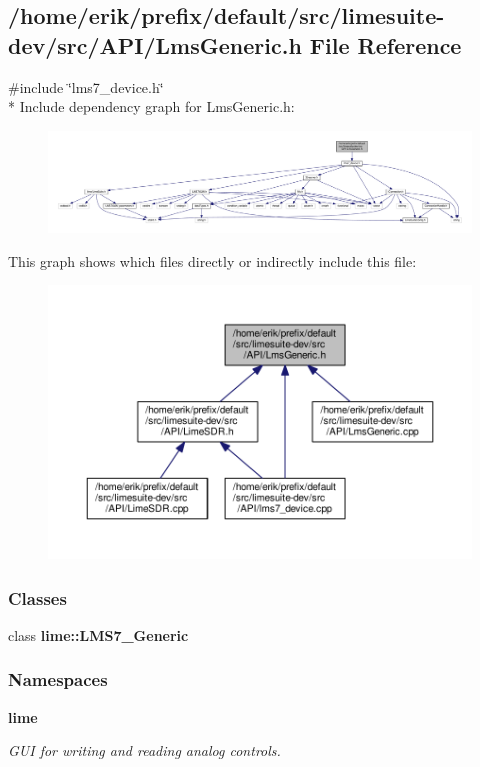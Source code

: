 \subsection{/home/erik/prefix/default/src/limesuite-\/dev/src/\+A\+P\+I/\+Lms\+Generic.h File Reference}
\label{LmsGeneric_8h}
{\ttfamily \#include \char`\"{}lms7\+\_\+device.\+h\char`\"{}}\\*
Include dependency graph for Lms\+Generic.\+h\+:
\nopagebreak
\begin{figure}[H]
\begin{center}
\leavevmode
\includegraphics[width=350pt]{d9/d8e/LmsGeneric_8h__incl}
\end{center}
\end{figure}
This graph shows which files directly or indirectly include this file\+:
\nopagebreak
\begin{figure}[H]
\begin{center}
\leavevmode
\includegraphics[width=350pt]{d8/d0d/LmsGeneric_8h__dep__incl}
\end{center}
\end{figure}
\subsubsection*{Classes}
\begin{DoxyCompactItemize}
\item 
class {\bf lime\+::\+L\+M\+S7\+\_\+\+Generic}
\end{DoxyCompactItemize}
\subsubsection*{Namespaces}
\begin{DoxyCompactItemize}
\item 
 {\bf lime}
\begin{DoxyCompactList}\small\item\em G\+UI for writing and reading analog controls. \end{DoxyCompactList}\end{DoxyCompactItemize}
